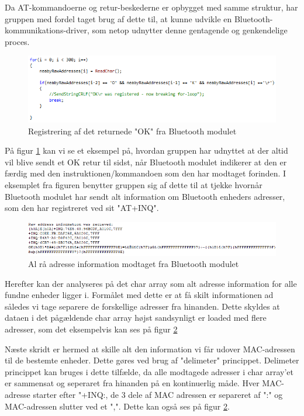 Da AT-kommandoerne og retur-beskederne er opbygget med samme struktur, har gruppen med fordel taget brug af dette til, at kunne udvikle en Bluetooth-kommunikations-driver, som netop udnytter denne gentagende og genkendelige proces. 

\begin{figure}[H]
	\centering
	\includegraphics[width = 400 pt]{Img/OK_registrered.PNG}
	\caption{Registrering af det returnede "OK" fra Bluetooth modulet}
	\label{fig:OK_registrered}
\end{figure}

På figur \ref{fig:OK_registrered} kan vi se et eksempel på, hvordan gruppen har udnyttet at der altid vil blive sendt et OK retur til sidst, når Bluetooth modulet indikerer at den er færdig med den instruktionen/kommandoen som den har modtaget forinden. I eksemplet fra figuren benytter gruppen sig af dette til at tjekke hvornår Bluetooth modulet har sendt alt information om Bluetooth enheders adresser, som den har registreret ved sit "AT+INQ".

\begin{figure}[H]
	\centering
	\includegraphics[width = 500 pt]{Img/raw_address.PNG}
	\caption{Al rå adresse information modtaget fra Bluetooth modulet}
	\label{fig:raw_address}
\end{figure}

Herefter kan der analyseres på det char array som alt adresse information for alle fundne enheder ligger i. Formålet med dette er at få skilt informationen ad således vi tage separere de forskellige adresser fra hinanden. Dette skyldes at dataen i det pågældende char array højst sandsynligt er loaded med flere adresser, som det eksempelvis kan ses på figur \ref{fig:raw_address}

Næste skridt er hermed at skille alt den information vi får udover MAC-adressen til de bestemte enheder. Dette gøres ved brug af "delimeter" princippet. Delimeter princippet kan bruges i dette tilfælde, da alle modtagede adresser i char array'et er sammensat og seperaret fra hinanden på en kontinuerlig måde. Hver MAC-adresse starter efter "+INQ:, de 3 dele af MAC adressen er separeret af ":" og MAC-adressen slutter ved et ",". Dette kan også ses på figur \ref{fig:raw_address}.


